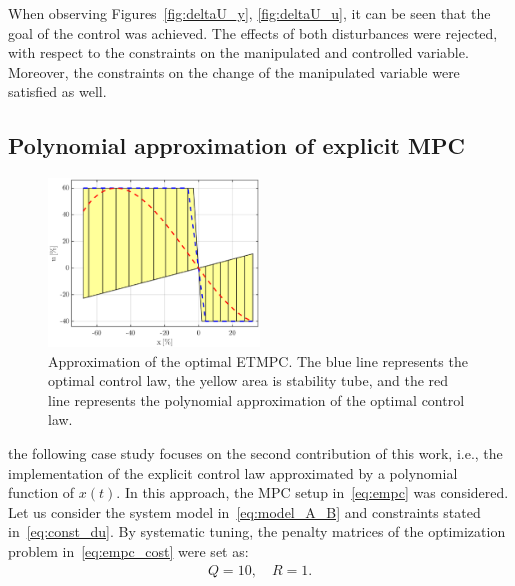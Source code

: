 \documentclass[letterpaper, 10 pt, conference]{ieeeconf}
\begin{document}
When observing Figures~\ref{fig:deltaU_y}, \ref{fig:deltaU_u}, it can be seen that the goal of the control was achieved. The effects of both disturbances were rejected, with respect to the constraints on the manipulated and controlled variable. Moreover, the constraints on the change of the manipulated variable were satisfied as well.

\subsection{Polynomial approximation of explicit MPC}
\label{sec:polynomial_exp}

\begin{figure}[bp!]
	\begin{center}
		\includegraphics[width=0.5\textwidth]{images/approximation.eps}
		\caption{Approximation of the optimal ETMPC. The blue line represents the optimal control law, the yellow area is stability tube, and the red line represents the polynomial approximation of the optimal control law.}
		\label{fig:approx}
	\end{center}
\end{figure}

the following case study focuses on the second contribution of this work, i.e., the implementation of the explicit control law approximated by a polynomial function of $x(t)$. In this approach, the MPC setup in~\eqref{eq:empc} was considered. Let us consider the system model in~\eqref{eq:model_A_B} and constraints stated in~\eqref{eq:const_du}. By systematic tuning, the penalty matrices of the optimization problem in~\eqref{eq:empc_cost} were set as:	
\begin{eqnarray}
\label{eq:setup_penalty_pol} 
	Q = 10, \quad R = 1.
\end{eqnarray}
\end{document}
